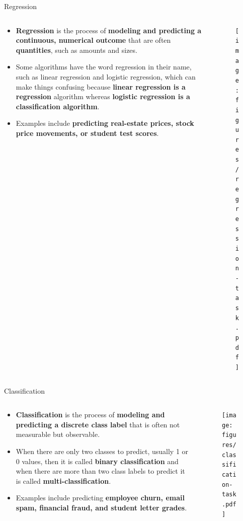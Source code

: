 \documentclass[document.tex]{subfiles}
\begin{document}
    \begin{frame}{Regression}
        \begin{columns}
            \begin{column}{.6\textwidth}
                \begin{itemize}
                    \item \textbf{Regression} is the process of \textbf{modeling and predicting a continuous, numerical outcome} that are often \textbf{quantities}, such as amounts and sizes.
                    \item Some algorithms have the word regression in their name, such as linear regression and logistic regression, which can make things confusing because \textbf{linear regression is a regression} algorithm whereas \textbf{logistic regression is a classification algorithm}. 
                    \item Examples include \textbf{predicting real-estate prices, stock price movements, or student test scores}.
                \end{itemize}
            \end{column}
            \begin{column}{.4\textwidth}
                \begin{figure}
                    \label{fig:regression-task}
                    \texttt{[image: figures/regression-task.pdf]}
                \end{figure}
            \end{column}
        \end{columns}
    \end{frame}

    \begin{frame}{Classification}
        \begin{columns}
            \begin{column}{.6\textwidth}
                \begin{itemize}
                    \item \textbf{Classification} is the process of \textbf{modeling and predicting a discrete class label} that is often not measurable but observable.
                    \item When there are only two classes to predict, usually 1 or 0 values, then it is called \textbf{binary classification} and when there are more than two class labels to predict it is called \textbf{multi-classification}.
                    \item Examples include predicting \textbf{employee churn, email spam, financial fraud, and student letter grades}.
                \end{itemize}
            \end{column}
            \begin{column}{.4\textwidth}
                \begin{figure}
                    \label{fig:classification-task}
                    \texttt{[image: figures/classification-task.pdf]}
                \end{figure}
            \end{column}
        \end{columns}
    \end{frame}
\end{document}
